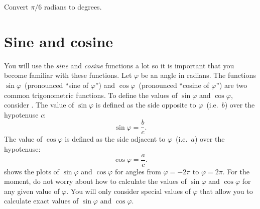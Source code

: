 \documentclass[a4paper,oneside,12pt]{article}
\begin{document}
\begin{exercise}
Convert $\pi / 6$ radians to degrees.
\end{exercise}




\section{Sine and cosine}

You will use the \emph{sine} and \emph{cosine} functions a lot so it
is important that you become familiar with these functions.  Let
$\varphi$ be an angle in radians.  The functions
$\sin\varphi$~(pronounced ``sine of $\varphi$'') and
$\cos\varphi$~(pronounced ``cosine of $\varphi$'') are two common
trigonometric functions.  To define the values of $\sin\varphi$ and
$\cos\varphi$, consider .
The value of $\sin\varphi$ is defined as the side opposite to
$\varphi$~(i.e.~$b$) over the hypotenuse $c$:
\begin{equation}
\label{eqn:define_sine}
\sin\varphi
=
\frac{b}{c}.
\end{equation}
The value of $\cos\varphi$ is defined as the side adjacent to
$\varphi$~(i.e.~$a$) over the hypotenuse:
\begin{equation}
\label{eqn:define_cosine}
\cos\varphi
=
\frac{a}{c}.
\end{equation}
 shows the plots of $\sin\varphi$ and
$\cos\varphi$ for angles from $\varphi = -2\pi$ to
$\varphi = 2\pi$.  For the moment, do not worry about how to calculate
the values of $\sin\varphi$ and $\cos\varphi$ for any given value of
$\varphi$.  You will only consider special values of $\varphi$ that
allow you to calculate exact values of $\sin\varphi$ and
$\cos\varphi$.
\end{document}

